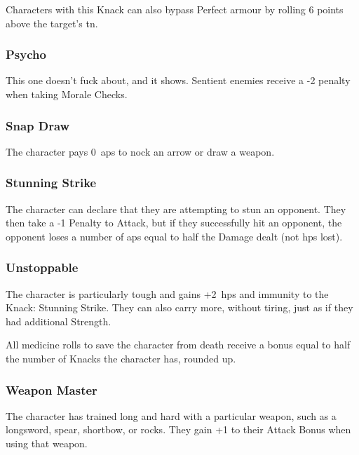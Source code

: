 \begin{multicols}{2}
Characters with this Knack can also bypass Perfect armour by rolling 6 points above the target's \gls{tn}.

\subsubsection{Psycho}

This one doesn't fuck about, and it shows.
Sentient enemies receive a -2 penalty when taking Morale Checks.%

\subsubsection{Snap Draw}

The character pays 0~\glspl{ap} to nock an arrow or draw a weapon.

\subsubsection{Stunning Strike}\label{stunningstrike}

The character can declare that they are attempting to stun an opponent.
They then take a -1 Penalty to Attack, but if they successfully hit an opponent, the opponent loses a number of \glspl{ap} equal to half the Damage dealt (not \glspl{hp} lost).

\subsubsection{Unstoppable}

The character is particularly tough and gains +2~\glspl{hp} and immunity to the Knack: Stunning Strike.
They can also carry more, without tiring, just as if they had additional Strength.

All medicine rolls to save the character from death receive a bonus equal to half the number of Knacks the character has, rounded up.

\subsubsection{Weapon Master}

The character has trained long and hard with a particular weapon, such as a longsword, spear, shortbow, or rocks.
They gain +1 to their Attack Bonus when using that weapon.

\end{multicols}

